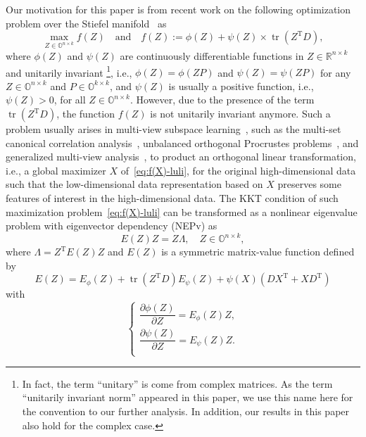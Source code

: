 \documentclass[11pt]{article}
\def\bbO{\mathbb{O}}
\def\bbR{\mathbb{R}}
\DeclareMathOperator{\tr}{tr}
\DeclareMathOperator{\T}{T}
\theoremstyle{definition}
\numberwithin{equation}{section}
\numberwithin{figure}{section}
\numberwithin{table}{section}
\begin{document}
Our motivation for this paper is from recent work on the following optimization problem over
the Stiefel manifold~\cite{luli:22,wazl:22,zhwb:22} as
\begin{equation}\label{eq:f(X)-luli}
    \max_{Z\in\bbO^{n\times k}}f(Z)\quad\mbox{and}\quad f(Z):=\phi(Z)+\psi(Z)\times\tr(Z^{\T}D),
\end{equation}
where $\phi(Z)$ and $\psi(Z)$ are continuously differentiable functions in $Z\in\bbR^{n\times k}$ and unitarily invariant
\footnote{In fact, the term ``unitary'' is come from complex matrices.
As the term ``unitarily invariant norm'' appeared in this paper,
we use this name here for the convention to our further analysis.
In addition, our results in this paper also hold for the complex case.},
i.e., $\phi(Z)=\phi(ZP)$ and $\psi(Z)=\psi(ZP)$ for any $Z\in\bbO^{n\times k}$ and $P\in\bbO^{k\times k}$,
and $\psi(Z)$ is usually a positive function, i.e., $\psi(Z)>0$, for all $Z\in\bbO^{n\times k}$.
However, due to the presence of the term $\tr(Z^{\T}D)$, the function $f(Z)$ is not unitarily invariant anymore.
Such a problem usually arises in  multi-view subspace learning~\cite{cugh:15,sumd:19},
such as the multi-set canonical correlation analysis~\cite{visp:07},
unbalanced orthogonal Procrustes problems~\cite{elpa:99,godi:04,zhys:20},
and generalized multi-view analysis~\cite{shkd:12}, to product an orthogonal linear transformation,
i.e., a global maximizer $X$ of~\eqref{eq:f(X)-luli}, for the original high-dimensional data such that the low-dimensional
data representation based on $X$ preserves some features of interest in the high-dimensional data.
The KKT condition of such maximization problem~\eqref{eq:f(X)-luli} can be transformed as a nonlinear eigenvalue problem
with eigenvector dependency (NEPv) as
\begin{equation} \label{eq:nepv}
    E(Z)Z=Z\Lambda, \quad Z\in\bbO^{n\times k},
\end{equation}
where $\Lambda=Z^{\T}E(Z)Z$ and $E(Z)$ is a symmetric matrix-value function defined by
\begin{equation}\label{eq:hg}
    E(Z)=E_{\phi}(Z)+\tr(Z^{\T}D)E_{\psi}(Z)+\psi(X)(DX^{\T}+XD^{\T})
\end{equation}
with
\[\begin{cases}
    \dfrac{\partial\phi(Z)}{\partial Z}=E_{\phi}(Z)Z,\\[1em]
    \dfrac{\partial\psi(Z)}{\partial Z}=E_{\psi}(Z)Z.\\
\end{cases}
\]
\end{document}
